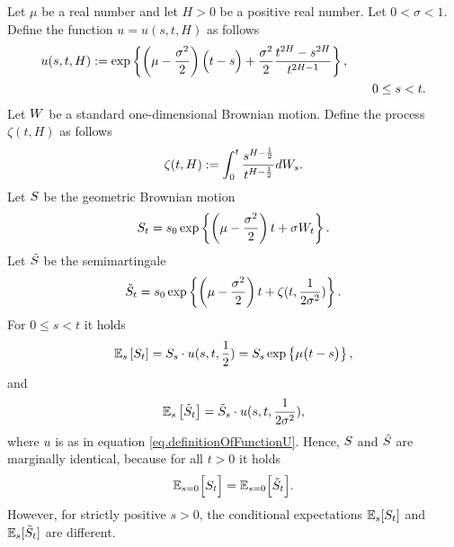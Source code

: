 \documentclass[10pt,a4paper]{article}
\begin{document}
	\begin{example} \label{example.LTIPisNotMarginallyRobust}
		Let $\mu$ be a real number and let $H>0$ be a positive real number. Let $0< \sigma < 1$. Define the function $u=u(s,t,H)$ as follows
		\begin{equation}\label{eq.definitionOfFunctionU}
		\begin{split}
		u(s,t,H):= \exp \left\lbrace
		\left(\mu - \frac{\sigma\squared}{2}\right)\Big(t-s\Big)
		+\frac{\sigma\squared}{2} \frac{t^{2H} - s^{2H}}{t^{2H-1} }
		\right\rbrace,&\\
		&\qquad 0\leq s < t.
		\end{split}
		\end{equation} 
		Let $\brownianMotion$ be a standard one-dimensional Brownian motion. Define the process $\zeta(t,H)$ as follows
		\begin{equation*}
		\zeta(t,H):=\intzerot \frac{s^{H-\half}}{t^{H-\half} }d\brownianMotion_s.
		\end{equation*}
		Let $\fundamentalPrice$ be the geometric Brownian motion
		\begin{equation*}
		\fundamentalPrice_t = s_0 \exp\left\lbrace \left(\mu - \frac{\sigma\squared}{2}\right)t + \sigma \brownianMotion_t \right\rbrace.
		\end{equation*}
		Let $\tilde{\fundamentalPrice}$ be the semimartingale 
		\begin{equation*}
		\tilde{\fundamentalPrice}_t = s_0 \exp\left\lbrace \left(\mu - \frac{\sigma\squared}{2}\right)t + \zeta(t,\frac{1}{2\sigma\squared}) \right\rbrace.
		\end{equation*}
		For $0\leq s < t$ it holds
		\begin{equation}\label{eq.conditionalMarginalExpectationsIntheCounterExampleGBM}
		\Expectation_s \left[ \fundamentalPrice_t\right] = \fundamentalPrice_s \cdot  u(s,t,\half) = \fundamentalPrice_s \exp\left\lbrace \mu \big(t-s\big)\right\rbrace,
		\end{equation}
		and 
		\begin{equation}\label{eq.conditionalMarginalExpectationsIntheCounterExample}
		\Expectation_s \left[ \tilde{\fundamentalPrice}_t\right] = \tilde{\fundamentalPrice}_s \cdot  u(s,t,\frac{1}{2\sigma\squared}) ,
		\end{equation}
		where $u$ is as in equation \eqref{eq.definitionOfFunctionU}. Hence, $\fundamentalPrice$ and $\tilde{\fundamentalPrice}$ are marginally identical, because for all $t>0$ it holds 
		\begin{equation*}
		\Expectation_{s=0} \Big[\fundamentalPrice_{t}\Big] = \Expectation_{s=0} \Big[\tilde{\fundamentalPrice}_{t}\Big] .
		\end{equation*}
		However, for strictly positive $s>0$, the conditional expectations $\Expectation_s [\fundamentalPrice_t]$ and $\Expectation_s [\tilde{\fundamentalPrice}_t]$ are different. 
		

\end{example}
\end{document}
